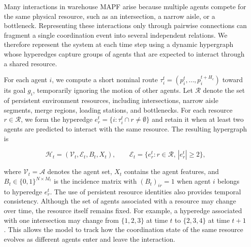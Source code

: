 \documentclass{article} %
\begin{document}
Many interactions in warehouse MAPF arise because multiple agents compete for the same physical resource, such as an intersection, a narrow aisle, or a bottleneck. Representing these interactions only through pairwise connections can fragment a single coordination event into several independent relations. We therefore represent the system at each time step using a dynamic hypergraph whose hyperedges capture groups of agents that are expected to interact through a shared resource.

For each agent $i$, we compute a short nominal route $\tau_i^t=(p_i^t,\ldots,p_i^{t+H_c})$ toward its goal $g_i$, temporarily ignoring the motion of other agents. Let $\mathcal{R}$ denote the set of persistent environment resources, including intersections, narrow aisle segments, merge regions, loading stations, and bottlenecks. For each resource $r\in\mathcal{R}$, we form the hyperedge $e_r^t=\{i:\tau_i^t\cap r\neq\emptyset\}$ and retain it when at least two agents are predicted to interact with the same resource. The resulting hypergraph is

\begin{equation}
\mathcal{H}_t=(\mathcal{V}_t,\mathcal{E}_t,B_t,X_t),
\qquad
\mathcal{E}_t=\{e_r^t:r\in\mathcal{R},\,|e_r^t|\ge2\},
\label{eq:hypergraph}
\end{equation}

where $\mathcal{V}_t=\mathcal{A}$ denotes the agent set, $X_t$ contains the agent features, and $B_t\in\{0,1\}^{N\times M_t}$ is the incidence matrix with $(B_t)_{ir}=1$ when agent $i$ belongs to hyperedge $e_r^t$. The use of persistent resource identities also provides temporal consistency. Although the set of agents associated with a resource may change over time, the resource itself remains fixed. For example, a hyperedge associated with one intersection may change from $\{1,2,3\}$ at time $t$ to $\{2,3,4\}$ at time $t+1$. This allows the model to track how the coordination state of the same resource evolves as different agents enter and leave the interaction.
\end{document}

